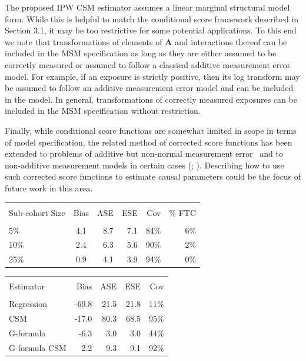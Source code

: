 \documentclass[12pt]{article}
\newcounter{tblcap}
\def\tblhead#1{\hline\\[-9pt]#1\\\hline\\[-9.75pt]}
\def\lastline{\\\hline}
\begin{document}
The proposed IPW CSM estimator assumes a linear marginal structural model form. While this is helpful to match the conditional score framework described in Section 3.1, it may be too restrictive for some potential applications. To this end we note that transformations of elements of $\bm{A}$ and interactions thereof can be included in the MSM specification as long as they are either assumed to be correctly measured or assumed to follow a classical additive measurement error model. For example, if an exposure is strictly positive, then its log transform may be assumed to follow an additive measurement error model and can be included in the model. In general, transformations of correctly measured exposures can be included in the MSM specification without restriction.

Finally, while conditional score functions are somewhat limited in scope in terms of model specification, the related method of corrected score functions has been extended to problems of additive but non-normal measurement error~\citep{buzas1996} and to non-additive measurement models in certain cases (\citealp{nakamura1990}; \citealp*{li2004}). Describing how to use such corrected score functions to estimate causal parameters could be the focus of future work in this area.

\newpage
\begin{Large}

\begin{table}[h]
{\tabcolsep=6.25pt
\begin{tabular}{@{}lcrrrr@{}}
\tblhead{Sub-cohort Size & Bias & ASE & ESE & Cov & \% FTC}
5\% & 4.1 & 8.7 & 7.1 & 84\% & 6\% \\
10\% & 2.4 & 6.3 & 5.6 & 90\% & 2\% \\
25\% & 0.9 & 4.1 & 3.9 & 94\% & 0\%
\lastline
\end{tabular}}
\end{table}

\end{Large}
\newpage

\begin{table}[h]
{\tabcolsep=4.25pt
\begin{tabular}{@{}lrrrr@{}}
\tblhead{Estimator & Bias & ASE & ESE & Cov}
Regression & -69.8 & 21.5 & 21.8 & 11\% \\
CSM & -17.0 & 80.3 & 68.5 & 95\% \\
G-formula & -6.3 & 3.0 & 3.0 & 44\% \\
G-formula CSM & 2.2 & 9.3 & 9.1 & 92\%
\lastline
\end{tabular}}
\end{table}
\end{document}
